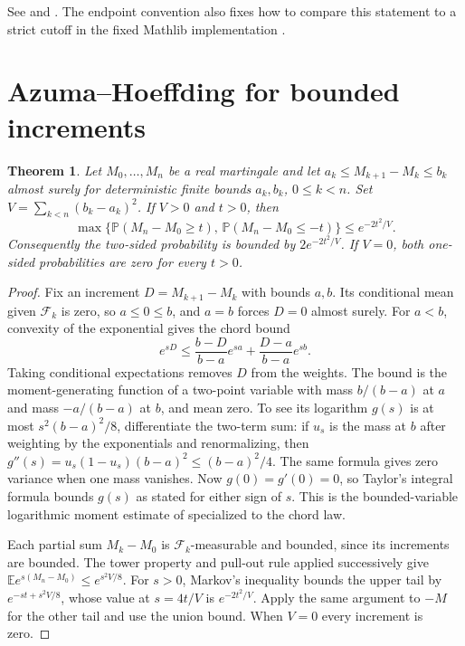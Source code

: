 \documentclass[11pt,oneside,openany]{book}
\theoremstyle{plain}
\newtheorem{theorem}{Theorem}[chapter]
\theoremstyle{definition}
\theoremstyle{remark}
\begin{document}
See \cite[Sections 11.2--11.5]{Williams} and
\cite[Lemma 9.18]{Kallenberg}. The endpoint convention also
fixes how to compare this statement to a strict cutoff in
the fixed Mathlib implementation \cite{Mathlib}.

\section{Azuma--Hoeffding for bounded increments}\label{p207:W29}

\begin{theorem}
Let \(M_0,\ldots,M_n\) be a real martingale and let
\(a_k\le M_{k+1}-M_k\le b_k\) almost surely for deterministic
finite bounds \(a_k,b_k\), \(0\le k<n\).
Set \(V=\sum_{k<n}(b_k-a_k)^2\). If \(V>0\) and \(t>0\), then
\[
 \max\{\mathbb P(M_n-M_0\ge t),\,\mathbb P(M_n-M_0\le-t)\}
       \le e^{-2t^2/V}.
\]
Consequently the two-sided probability is bounded by
\(2e^{-2t^2/V}\). If \(V=0\), both one-sided probabilities are zero
for every \(t>0\).
\end{theorem}
\begin{proof}
Fix an increment \(D=M_{k+1}-M_k\) with bounds \(a,b\).
Its conditional mean given \(\mathcal F_k\) is zero,
so \(a\le0\le b\), and \(a=b\) forces \(D=0\) almost surely.
For \(a<b\), convexity of the exponential gives the chord bound
\[
 e^{sD}\le \frac{b-D}{b-a}e^{sa}+\frac{D-a}{b-a}e^{sb}.
\]
Taking conditional expectations removes \(D\) from the weights.
The bound is the moment-generating function of a two-point
variable with mass \(b/(b-a)\) at \(a\) and mass \(-a/(b-a)\)
at \(b\), and mean zero. To see its logarithm \(g(s)\) is at most
\(s^2(b-a)^2/8\), differentiate the two-term sum: if \(u_s\) is
the mass at \(b\) after weighting by the exponentials and
renormalizing, then \(g''(s)=u_s(1-u_s)(b-a)^2\le(b-a)^2/4\).
The same formula gives zero variance when one mass vanishes.
Now \(g(0)=g'(0)=0\), so Taylor's integral formula bounds
\(g(s)\) as stated for either sign of \(s\).
This is the bounded-variable logarithmic moment estimate of
\cite[W25]{P205} specialized to the chord law.

Each partial sum \(M_k-M_0\) is \(\mathcal F_k\)-measurable
and bounded, since its increments are bounded.
The tower property and pull-out rule applied successively give
\(\mathbb E e^{s(M_n-M_0)}\le e^{s^2 V/8}\).
For \(s>0\), Markov's inequality bounds the upper tail by
\(e^{-st+s^2V/8}\), whose value at \(s=4t/V\) is \(e^{-2t^2/V}\).
Apply the same argument to \(-M\) for the other tail and use the
union bound. When \(V=0\) every increment is zero.
\end{proof}
\end{document}
